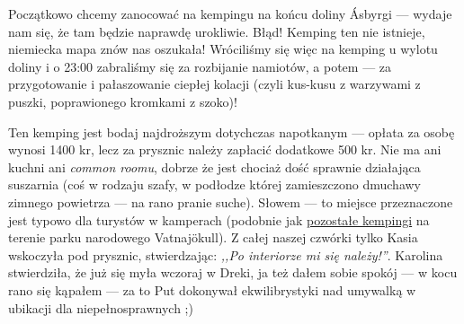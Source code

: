 
Początkowo chcemy zanocować na kempingu na końcu doliny Ásbyrgi --- wydaje nam się, że tam będzie naprawdę urokliwie. Błąd! Kemping ten nie istnieje, niemiecka mapa znów nas oszukała! Wróciliśmy się więc na kemping u wylotu doliny i o 23:00 zabraliśmy się za rozbijanie namiotów, a potem --- za przygotowanie i pałaszowanie ciepłej kolacji (czyli kus-kusu z warzywami z puszki, poprawionego kromkami z szoko)!

Ten kemping jest bodaj najdroższym dotychczas napotkanym --- opłata za osobę wynosi 1400 kr, lecz za prysznic należy zapłacić dodatkowe 500 kr. Nie ma ani kuchni ani \emph{common roomu}, dobrze że jest chociaż dość sprawnie działająca suszarnia (coś w rodzaju szafy, w podłodze której zamieszczono dmuchawy zimnego powietrza --- na rano pranie suche). Słowem --- to miejsce przeznaczone jest typowo dla turystów w kamperach (podobnie jak \href{http://www.vatnajokulsthjodgardur.is/english/plan-your-visit/camping/}{pozostałe kempingi} na terenie parku narodowego Vatnajökull). Z całej naszej czwórki tylko Kasia wskoczyła pod prysznic, stwierdzając: \emph{,,Po interiorze mi się należy!''}. Karolina stwierdziła, że już się myła wczoraj  w Dreki, ja też dałem sobie spokój --- w kocu rano się kąpałem --- za to Put dokonywał ekwilibrystyki nad umywalką w ubikacji dla niepełnosprawnych ;)

